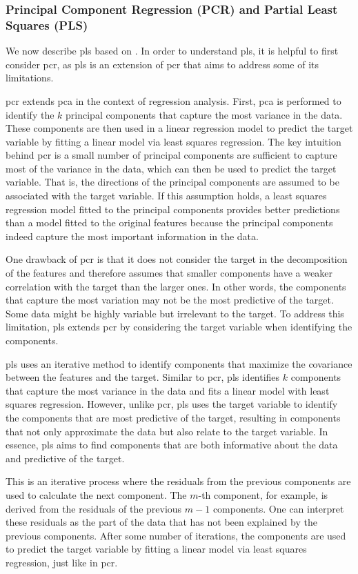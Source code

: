 \subsubsection{Principal Component Regression (PCR) and Partial Least Squares (PLS)}\label{subsec:pls}
We now describe \gls{pls} based on \citet{James2023AnIS}.
In order to understand \gls{pls}, it is helpful to first consider \gls{pcr}, as \gls{pls} is an extension of \gls{pcr} that aims to address some of its limitations.

\gls{pcr} extends \gls{pca} in the context of regression analysis.
First, \gls{pca} is performed to identify the $k$ principal components that capture the most variance in the data.
These components are then used in a linear regression model to predict the target variable by fitting a linear model via least squares regression.
The key intuition behind \gls{pcr} is a small number of principal components are sufficient to capture most of the variance in the data, which can then be used to predict the target variable.
That is, the directions of the principal components are assumed to be associated with the target variable.
If this assumption holds, a least squares regression model fitted to the principal components provides better predictions than a model fitted to the original features because the principal components indeed capture the most important information in the data.

One drawback of \gls{pcr} is that it does not consider the target in the decomposition of the features and therefore assumes that smaller components have a weaker correlation with the target than the larger ones.
In other words, the components that capture the most variation may not be the most predictive of the target.
Some data might be highly variable but irrelevant to the target.
To address this limitation, \gls{pls} extends \gls{pcr} by considering the target variable when identifying the components.

\gls{pls} uses an iterative method to identify components that maximize the covariance between the features and the target.
Similar to \gls{pcr}, \gls{pls} identifies $k$ components that capture the most variance in the data and fits a linear model with least squares regression.
However, unlike \gls{pcr}, \gls{pls} uses the target variable to identify the components that are most predictive of the target, resulting in components that not only approximate the data but also relate to the target variable.
In essence, \gls{pls} aims to find components that are both informative about the data and predictive of the target.

This is an iterative process where the residuals from the previous components are used to calculate the next component.
The $m$-th component, for example, is derived from the residuals of the previous $m-1$ components.
One can interpret these residuals as the part of the data that has not been explained by the previous components.
After some number of iterations, the components are used to predict the target variable by fitting a linear model via least squares regression, just like in \gls{pcr}.